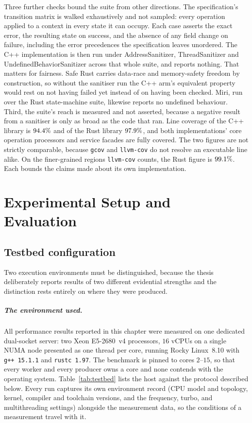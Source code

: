 \documentclass[english,oneside,a4paper,censored,csm,software-track-2020]{HYthesisML}
\begin{document}
Three further checks bound the suite from other directions. The specification's transition
matrix is walked exhaustively and not sampled: every operation applied to a context in
every state it can occupy. Each case asserts the exact error, the resulting state on success, and
the absence of any field change on failure, including the error precedences the specification
leaves unordered. The C++ implementation is then run under AddressSanitizer, ThreadSanitizer
and UndefinedBehaviorSanitizer across that whole suite, and reports nothing. That matters for
fairness. Safe Rust carries data-race and memory-safety freedom by construction, so without
the sanitiser run the C++ arm's equivalent property would rest on not having failed yet instead
of on having been checked. Miri, run over the Rust state-machine suite, likewise reports no
undefined behaviour. Third, the suite's reach is measured and not asserted, because a
negative result from a sanitiser is only as broad as the code that ran. Line coverage of the
C++ library is $94.4\%$ and of the Rust library $97.9\%$, and both implementations' core
operation processors and service facades are fully covered. The two figures are not strictly
comparable, because \texttt{gcov} and \texttt{llvm-cov} do not resolve an executable line alike.
On the finer-grained regions \texttt{llvm-cov} counts, the Rust figure is $99.1\%$.
Each bounds the claims made about its own implementation.

\chapter{Experimental Setup and Evaluation\label{chapter:eval}}

\section{Testbed configuration\label{sec:testbed}}
Two execution environments must be distinguished, because the thesis deliberately reports
results of two different evidential strengths and the distinction rests entirely on where
they were produced.

\paragraph{The environment used.}
All performance results reported in this chapter were measured on one dedicated dual-socket
server: two Xeon E5-2680~v4 processors, $16$ vCPUs on a single NUMA node presented as one thread
per core, running Rocky Linux~8.10 with \texttt{g++~15.1.1} and \texttt{rustc~1.97}. The
benchmark is pinned to cores $2$--$15$, so that every worker and every producer owns a core and
none contends with the operating system. Table~\ref{tab:testbed} lists the host against the
protocol described below. Every run captures its own
environment record (CPU model and topology, kernel, compiler and toolchain versions, and the
frequency, turbo, and multithreading settings) alongside the measurement data, so the conditions
of a measurement travel with it.
\end{document}
